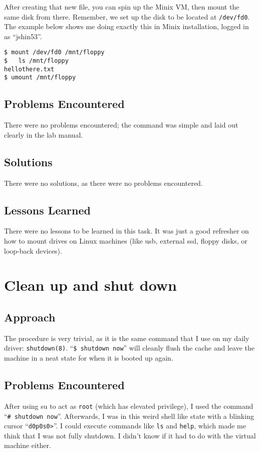 \documentclass[11pt]{article}
\begin{document}
After creating that new file, you can spin up the {\sc Minix} VM, then mount the same disk from there. Remember, we set up the disk to be located at {\tt/dev/fd0}. The example below shows me doing exactly this in {\sc Minix} installation, logged in as ``jshin53''.

\begin{verbatim}
$ mount /dev/fd0 /mnt/floppy
$	ls /mnt/floppy
hellothere.txt
$ umount /mnt/floppy
\end{verbatim}

\subsection{Problems Encountered}
There were no problems encountered; the command was simple and laid out clearly in the lab manual.

\subsection{Solutions}
There were no solutions, as there were no problems encountered.

\subsection{Lessons Learned}
There were no lessons to be learned in this task. It was just a good refresher on how to mount drives on Linux machines (like usb, external ssd, floppy disks, or loop-back devices).

\section{Clean up and shut down}
\subsection{Approach}
The procedure is very trivial, as it is the same command that I use on my daily driver: {\tt shutdown(8)}. ``{\tt \$ shutdown now}'' will cleanly flush the cache and leave the machine in a neat state for when it is booted up again.

\subsection{Problems Encountered}
After using su to act as {\tt root} (which has elevated privilege), I used the command ``{\tt \# shutdown now}''. Afterwards, I was in this weird shell like state with a blinking cursor ``{\tt d0p0s0>}''. I could execute commands like {\tt ls} and {\tt help}, which made me think that I was not fully shutdown. I didn't know if it had to do with the virtual machine either.
\end{document}
